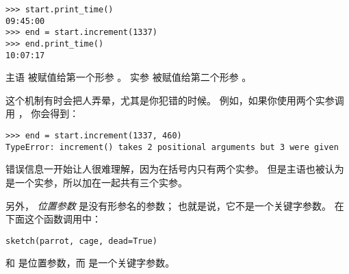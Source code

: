 \begin{lstlisting}
>>> start.print_time()
09:45:00
>>> end = start.increment(1337)
>>> end.print_time()
10:07:17
\end{lstlisting}

%

主语  被赋值给第一个形参 。
实参  被赋值给第二个形参  。


这个机制有时会把人弄晕，尤其是你犯错的时候。
例如，如果你使用两个实参调用 ， 你会得到：
  

\begin{lstlisting}
>>> end = start.increment(1337, 460)
TypeError: increment() takes 2 positional arguments but 3 were given
\end{lstlisting}

%

错误信息一开始让人很难理解，因为在括号内只有两个实参。
但是主语也被认为是一个实参，所以加在一起共有三个实参。

另外， {\em 位置参数} 是没有形参名的参数； 也就是说，它不是一个关键字参数。
在下面这个函数调用中：
  

\begin{lstlisting}
sketch(parrot, cage, dead=True)
\end{lstlisting}


 和  是位置参数，而  是一个关键字参数。

